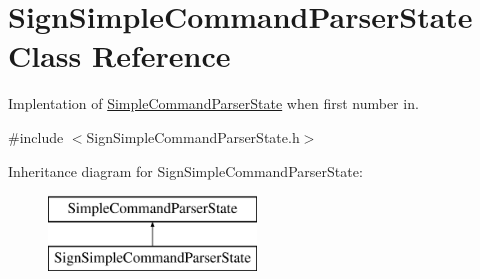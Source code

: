 \hypertarget{class_sign_simple_command_parser_state}{}\section{Sign\+Simple\+Command\+Parser\+State Class Reference}
\label{class_sign_simple_command_parser_state}


Implentation of \hyperlink{class_simple_command_parser_state}{Simple\+Command\+Parser\+State} when first number in.  




{\ttfamily \#include $<$Sign\+Simple\+Command\+Parser\+State.\+h$>$}

Inheritance diagram for Sign\+Simple\+Command\+Parser\+State\+:\begin{figure}[H]
\begin{center}
\leavevmode
\includegraphics[height=2.000000cm]{class_sign_simple_command_parser_state}
\end{center}
\end{figure}
